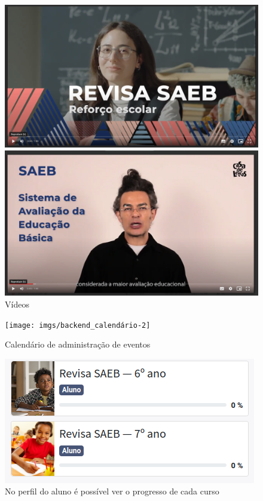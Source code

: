 \begin{figure}[H]
\includegraphics[width=\textwidth]{imgs/video1}\bigskip

\includegraphics[width=\textwidth]{imgs/video-2}
\caption{Vídeos}
\end{figure}



\begin{figure}[H]
\texttt{[image: imgs/backend\_calendário-2]}
\caption{Calendário de administração de eventos}
\end{figure}


\begin{figure}[H]
\includegraphics[width=\textwidth]{imgs/progresso}
\caption{No perfil do aluno é possível ver o progresso de cada curso}
\end{figure}

